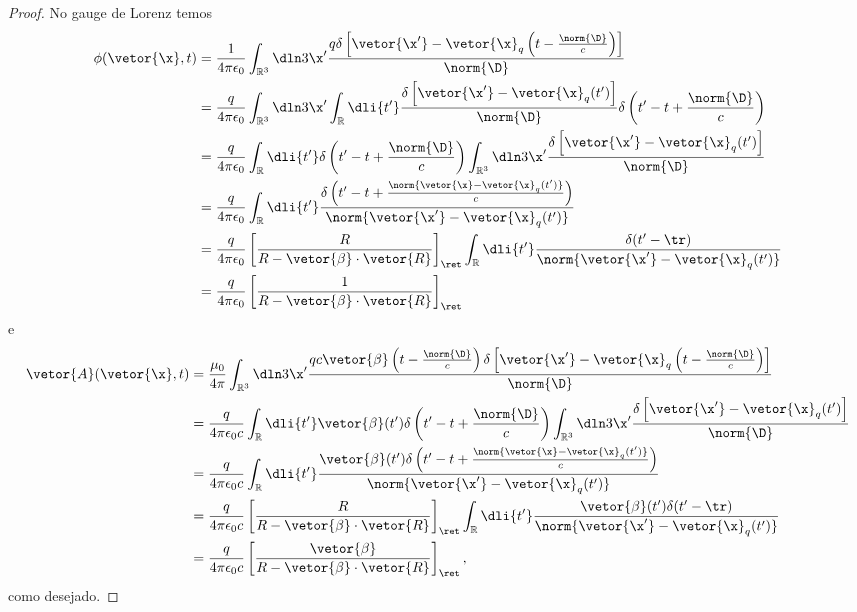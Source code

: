 \begin{proof}
   No gauge de Lorenz temos
   \begin{align*}
      \phi(\vetor{\x}, t) &= \frac{1}{4\pi \epsilon_0}\int_{\mathbb{R}^3} \dln3{\x'} \frac{q\delta\left[\vetor{\x'} - \vetor{\x}_q\left(t - \frac{\norm{\D}}{c}\right)\right]}{\norm{\D}}\\
                          &= \frac{q}{4\pi \epsilon_0}\int_{\mathbb{R}^3} \dln3{\x'} \int_{\mathbb{R}} \dli{t'} \frac{\delta\left[\vetor{\x'} - \vetor{\x}_q(t')\right]}{\norm{\D}} \delta\left(t' - t + \frac{\norm{\D}}{c}\right)\\
                          &= \frac{q}{4\pi \epsilon_0} \int_{\mathbb{R}} \dli{t'} \delta\left(t' - t + \frac{\norm{\D}}{c}\right) \int_{\mathbb{R}^3} \dln3{\x'} \frac{\delta\left[\vetor{\x'} - \vetor{\x}_q(t')\right]}{\norm{\D}}\\
                          &= \frac{q}{4\pi \epsilon_0} \int_{\mathbb{R}} \dli{t'} \frac{\delta\left(t' - t + \frac{\norm{\vetor{\x} - \vetor{\x}_q(t')}}{c}\right)}{\norm{\vetor{\x'} - \vetor{\x}_q(t')}}\\
                          &= \frac{q}{4\pi \epsilon_0} \left[\frac{R}{R - \vetor{\beta} \cdot \vetor{R}}\right]_\ret \int_{\mathbb{R}} \dli{t'} \frac{\delta(t' - \tr)}{\norm{\vetor{\x'} - \vetor{\x}_q(t')}}\\
                          &= \frac{q}{4\pi \epsilon_0} \left[\frac{1}{R - \vetor{\beta} \cdot \vetor{R}}\right]_\ret
   \end{align*}
   e
   \begin{align*}
      \vetor{A}(\vetor{\x}, t) &= \frac{\mu_0}{4\pi}\int_{\mathbb{R}^3} \dln3{\x'} \frac{qc\vetor{\beta}\left(t - \frac{\norm{\D}}{c}\right)\delta\left[\vetor{\x'} - \vetor{\x}_q\left(t - \frac{\norm{\D}}{c}\right)\right]}{\norm{\D}}\\
                               &= \frac{q}{4\pi \epsilon_0 c} \int_{\mathbb{R}} \dli{t'} \vetor{\beta}(t')\delta\left(t' - t + \frac{\norm{\D}}{c}\right) \int_{\mathbb{R}^3} \dln3{\x'} \frac{\delta\left[\vetor{\x'} - \vetor{\x}_q(t')\right]}{\norm{\D}}\\
                               &= \frac{q}{4\pi \epsilon_0 c} \int_{\mathbb{R}} \dli{t'} \frac{\vetor{\beta}(t')\delta\left(t' - t + \frac{\norm{\vetor{\x} - \vetor{\x}_q(t')}}{c}\right)}{\norm{\vetor{\x'} - \vetor{\x}_q(t')}}\\
                               &= \frac{q}{4\pi \epsilon_0 c} \left[\frac{R}{R - \vetor{\beta} \cdot \vetor{R}}\right]_\ret \int_{\mathbb{R}} \dli{t'} \frac{\vetor{\beta}(t')\delta(t' - \tr)}{\norm{\vetor{\x'} - \vetor{\x}_q(t')}}\\
                               &= \frac{q}{4\pi \epsilon_0c} \left[\frac{\vetor{\beta}}{R - \vetor{\beta} \cdot \vetor{R}}\right]_\ret,
   \end{align*}
   como desejado.
\end{proof}
